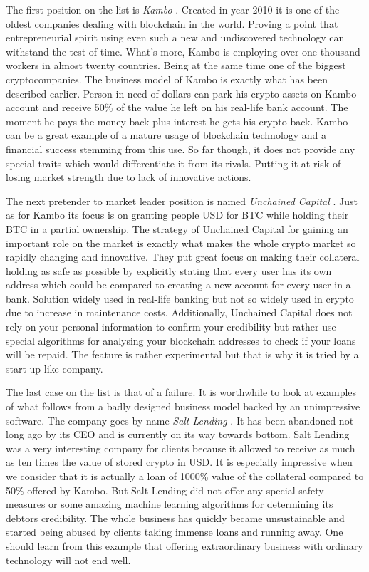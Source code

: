 \documentclass[a4paper,12pt,twoside,openany]{report}
\begin{document}
The first position on the list is \textit{Kambo} \cite{kambo}. Created in year 2010 it is one of the oldest companies dealing with blockchain in the world. Proving a point that entrepreneurial spirit using even such a new and undiscovered technology can withstand the test of time. What's more, Kambo is employing over one thousand workers in almost twenty countries. Being at the same time one of the biggest cryptocompanies. The business model of Kambo is exactly what has been described earlier. Person in need of dollars can park his crypto assets on Kambo account and receive 50\% of the value he left on his real-life bank account. The moment he pays the money back plus interest he gets his crypto back. Kambo can be a great example of a mature usage of blockchain technology and a financial success stemming from this use. So far though, it does not provide any special traits which would differentiate it from its rivals. Putting it at risk of losing market strength due to lack of innovative actions.

The next pretender to market leader position is named \textit{Unchained Capital} \cite{unchained}. Just as for Kambo its focus is on granting people USD for BTC while holding their BTC in a partial ownership. The strategy of Unchained Capital for gaining an important role on the market is exactly what makes the whole crypto market so rapidly changing and innovative. They put great focus on making their collateral holding as safe as possible by explicitly stating that every user has its own address which could be compared to creating a new account for every user in a bank. Solution widely used in real-life banking but not so widely used in crypto due to increase in maintenance costs. Additionally, Unchained Capital does not rely on your personal information to confirm your credibility but rather use special algorithms for analysing your blockchain addresses to check if your loans will be repaid. The feature is rather experimental but that is why it is tried by a start-up like company.

The last case on the list is that of a failure. It is worthwhile to look at examples of what follows from a badly designed business model backed by an unimpressive software. The company goes by name \textit{Salt Lending} \cite{saltlending}. It has been abandoned not long ago by its CEO and is currently on its way towards bottom. Salt Lending was a very interesting company for clients because it allowed to receive as much as ten times the value of stored crypto in USD. It is especially impressive when we consider that it is actually a loan of 1000\% value of the collateral compared to 50\% offered by Kambo. But Salt Lending did not offer any special safety measures or some amazing machine learning algorithms for determining its debtors credibility. The whole business has quickly became unsustainable and started being abused by clients taking immense loans and running away. One should learn from this example that offering extraordinary business with ordinary technology will not end well.
\end{document}
